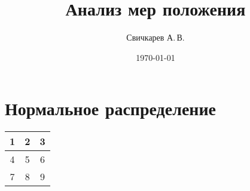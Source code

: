 \documentclass{report} %
\title{Анализ мер положения} %
\author{Свичкарев А.\,В.} %
\date{\today} %
\begin{document}

\maketitle %

\section{Нормальное распределение}

\begin{center}
	\begin{tabular}{|c|c|c|} \hline
		1 & 2 & 3 \\ \hline
		4 & 5 & 6 \\ \hline
		7 & 8 & 9 \\ \hline
	\end{tabular}
\end{center}
\end{document}
